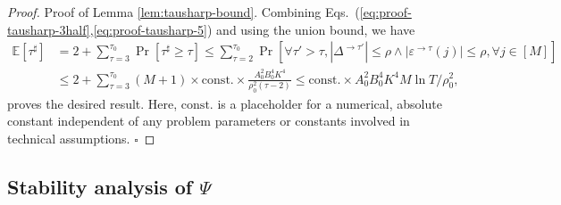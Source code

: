 \documentclass[opre]{informs3aa}
\newcommand{\const}{\mathrm{const}}
\begin{document}
\begin{proof}{Proof of Lemma \ref{lem:tausharp-bound}.}
Combining Eqs.~(\ref{eq:proof-tausharp-3half},\ref{eq:proof-tausharp-5}) and using the union bound, we have
\begin{align*}
\mathbb E[\tau^\sharp] &=2 + \sum_{\tau=3}^{\tau_0}\Pr[\tau^\sharp\geq\tau]  \leq \sum_{\tau=2}^{\tau_0}\Pr\left[\forall\tau'>\tau, |\Delta^{\to\tau'}|\leq\rho\wedge |\varepsilon^{\to\tau}(j)|\leq\rho,\forall j\in[M]\right]\\
&\leq 2 + \sum_{\tau=3}^{\tau_0}(M+1)\times \const.\times\frac{A_0^2B_0^4K^4}{\rho_0^2(\tau-2)} \leq \const.\times A_0^2B_0^4K^4M\ln T/\rho_0^2,
\end{align*}
proves the desired result. 
{Here, $\const.$ is a placeholder for a numerical, absolute constant independent of any problem parameters or constants involved in technical assumptions.}
$\square$
\end{proof}

\subsection{Stability analysis of $\Psi$}
\end{document}
